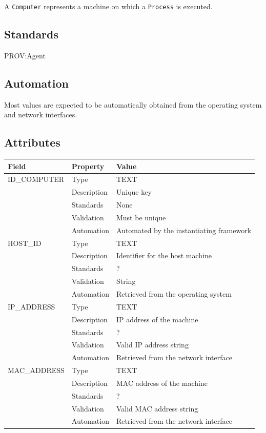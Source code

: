 \documentclass[
]{article}
\newcounter{none}
\begin{document}
A \texttt{Computer} represents a machine on which a \texttt{Process} is
executed.

\subsection{Standards}\label{standards-8}

PROV:Agent

\subsection{Automation}\label{automation-8}

Most values are expected to be automatically obtained from the operating
system and network interfaces.

\subsection{Attributes}\label{attributes-8}

{\def\LTcaptype{none} 
\begin{longtable}[]{@{}lll@{}}
\toprule\noalign{}
Field & Property & Value \\
\midrule\noalign{}
\endhead
\bottomrule\noalign{}
\endlastfoot
ID\_COMPUTER & Type & TEXT \\
& Description & Unique key \\
& Standards & None \\
& Validation & Must be unique \\
& Automation & Automated by the instantiating framework \\
HOST\_ID & Type & TEXT \\
& Description & Identifier for the host machine \\
& Standards & ? \\
& Validation & String \\
& Automation & Retrieved from the operating system \\
IP\_ADDRESS & Type & TEXT \\
& Description & IP address of the machine \\
& Standards & ? \\
& Validation & Valid IP address string \\
& Automation & Retrieved from the network interface \\
MAC\_ADDRESS & Type & TEXT \\
& Description & MAC address of the machine \\
& Standards & ? \\
& Validation & Valid MAC address string \\
& Automation & Retrieved from the network interface \\
\end{longtable}
}
\end{document}
